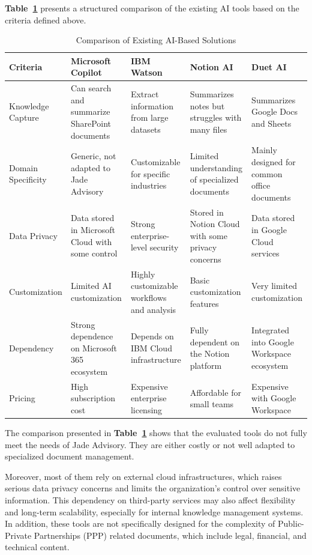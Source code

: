 \textbf{Table~\ref{tab:tools_comparison_explained}} presents a structured comparison
of the existing AI tools based on the criteria defined above.

\begin{table}[H]
\centering
\caption{Comparison of Existing AI-Based Solutions}
\label{tab:tools_comparison_explained}
\renewcommand{\arraystretch}{1.3}
\begin{tabular}{|>{\raggedright\arraybackslash}p{2.8cm}
|>{\raggedright\arraybackslash}p{3cm}
|>{\raggedright\arraybackslash}p{3cm}
|>{\raggedright\arraybackslash}p{3cm}
|>{\raggedright\arraybackslash}p{3cm}|}
\hline
\textbf{Criteria} & \textbf{Microsoft Copilot} & \textbf{IBM Watson}
& \textbf{Notion AI} & \textbf{Duet AI} \\
\hline
Knowledge Capture & Can search and summarize SharePoint documents &
Extract information from large datasets & Summarizes notes but struggles
with many files & Summarizes Google Docs and Sheets \\
\hline
Domain Specificity & Generic, not adapted to Jade Advisory &
Customizable for specific industries & Limited understanding of
specialized documents & Mainly designed for common office documents \\
\hline
Data Privacy & Data stored in Microsoft Cloud with some control &
Strong enterprise-level security & Stored in Notion Cloud with some
privacy concerns & Data stored in Google Cloud services \\
\hline
Customization & Limited AI customization & Highly customizable
workflows and analysis & Basic customization features &
Very limited customization \\
\hline
Dependency & Strong dependence on Microsoft 365 ecosystem &
Depends on IBM Cloud infrastructure & Fully dependent on the
Notion platform & Integrated into Google Workspace ecosystem \\
\hline
Pricing & High subscription cost & Expensive enterprise licensing &
Affordable for small teams & Expensive with Google Workspace \\
\hline
\end{tabular}
\end{table}

The comparison presented in \textbf{Table~\ref{tab:tools_comparison_explained}}
shows that the evaluated tools do not fully meet the needs of Jade Advisory.
They are either costly or not well adapted to specialized document management.

Moreover, most of them rely on external cloud infrastructures, which raises
serious data privacy concerns and limits the organization's control over
sensitive information. This dependency on third-party services may also
affect flexibility and long-term scalability, especially for internal
knowledge management systems. In addition, these tools are not specifically
designed for the complexity of Public-Private Partnerships (PPP) related
documents, which include legal, financial, and technical content.

